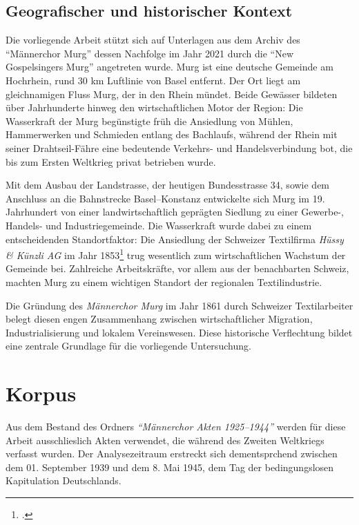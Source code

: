 \documentclass[12pt, a4paper, ngerman, bidi=default]{article}
\let\cite\footcite
\begin{document}
\subsection{Geografischer und historischer Kontext}
Die vorliegende Arbeit stützt sich auf Unterlagen aus dem Archiv des \enquote{Männerchor Murg} dessen Nachfolge im Jahr 2021 
durch die \enquote{New Gospelsingers Murg} angetreten wurde. Murg ist eine deutsche Gemeinde am Hochrhein, 
rund 30 km Luftlinie von Basel entfernt. Der Ort liegt am gleichnamigen Fluss Murg, der in den Rhein mündet. 
Beide Gewässer bildeten über Jahrhunderte hinweg den wirtschaftlichen Motor der Region: Die Wasserkraft der Murg 
begünstigte früh die Ansiedlung von Mühlen, Hammerwerken und Schmieden entlang des Bachlaufs, während der Rhein mit seiner 
Drahtseil-Fähre eine bedeutende Verkehrs- und Handelsverbindung bot, die bis zum Ersten Weltkrieg privat betrieben wurde.

Mit dem Ausbau der Landstrasse, der heutigen Bundesstrasse 34, sowie dem Anschluss an die Bahnstrecke Basel–Konstanz 
entwickelte sich Murg im 19. Jahrhundert von einer landwirtschaftlich geprägten Siedlung zu einer Gewerbe-, Handels- und 
Industriegemeinde. Die Wasserkraft wurde dabei zu einem entscheidenden Standortfaktor: Die Ansiedlung der Schweizer 
Textilfirma \textit{Hüssy \& Künzli AG} im Jahr 1853\cite[vgl.][]{gemeinde_murg_geschichte_nodate} trug wesentlich 
zum wirtschaftlichen Wachstum der Gemeinde bei. Zahlreiche Arbeitskräfte, vor allem aus der benachbarten Schweiz, 
machten Murg zu einem wichtigen Standort der regionalen Textilindustrie.

Die Gründung des \textit{Männerchor Murg} im Jahr 1861 durch Schweizer Textilarbeiter belegt diesen engen Zusammenhang 
zwischen wirtschaftlicher Migration, Industrialisierung und lokalem Vereinswesen. Diese historische Verflechtung bildet 
eine zentrale Grundlage für die vorliegende Untersuchung.


  

\newpage

\section{Korpus}
Aus dem Bestand des Ordners \textit{``Männerchor Akten 1925--1944''} werden für diese Arbeit ausschlieslich Akten verwendet, 
die während des Zweiten Weltkriegs verfasst wurden. Der Analysezeitraum erstreckt sich dementsprchend zwischen dem 01. September 1939 
und dem 8. Mai 1945, dem Tag der bedingungslosen Kapitulation Deutschlands.
\end{document}

